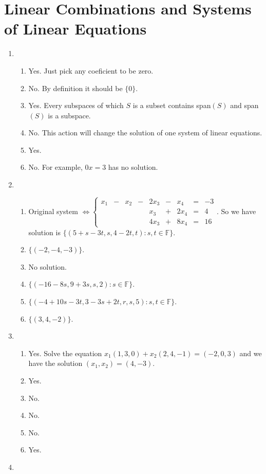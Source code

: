 \section{Linear Combinations and Systems of Linear Equations}
\begin{enumerate}
\item \begin{enumerate}
\item Yes. Just pick any coeficient to be zero.
\item No. By definition it should be $\{0\}$.
\item Yes. Every subspaces of which $S$ is a subset contains span$(S)$ and span$(S)$ is a subspace.
\item No. This action will change the solution of one system of linear equations.
\item Yes.
\item No. For example, $0x=3$ has no solution.
\end{enumerate}
\item \begin{enumerate}
\item Original system $\Leftrightarrow \left\{ \begin{array}{ccccccccc}x_1&-&x_2&-&2x_3&-&x_4&=&-3\\&&&&x_3&+&2x_4&=&4\\&&&&4x_3&+&8x_4&=&16\end{array}\right.$. So we have solution is $\{(5+s-3t,s,4-2t,t):s,t\in \mathbb{F}\}$.
\item $\{(-2,-4,-3)\}$.
\item No solution.
\item $\{(-16-8s,9+3s,s,2):s\in \mathbb{F}\}$.
\item $\{(-4+10s-3t,3-3s+2t,r,s,5):s,t \in \mathbb{F}\}$.
\item $\{(3,4,-2)\}$.
\end{enumerate}
\item \begin{enumerate}
\item Yes. Solve the equation $x_1(1,3,0)+x_2(2,4,-1)=(-2,0,3)$ and we have the solution $(x_1,x_2)=(4,-3)$.
\item Yes.
\item No.
\item No.
\item No.
\item Yes.
\end{enumerate}
\item \begin{enumerate}

\end{enumerate}
\end{enumerate}
